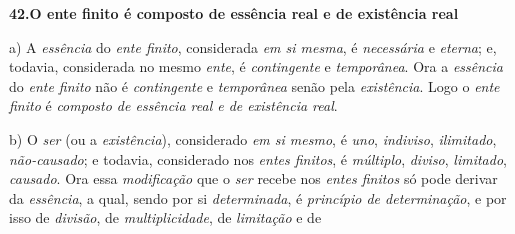 \documentclass[12pt,a4paper]{article}
\newcommand{\teseB}[2]{\bigskip\noindent\textbf{#1.\quad #2}\par}
\newcommand{\subp}[1]{\medskip\noindent#1)\quad}
\begin{document}
\teseB{42}{O ente finito é composto de essência real e de existência real}

\subp{a} A \emph{essência} do \emph{ente finito}, considerada \emph{em si
mesma}, é \emph{necessária} e \emph{eterna}; e, todavia, considerada no mesmo
\emph{ente}, é \emph{contingente} e \emph{temporânea}. Ora a \emph{essência} do
\emph{ente finito} não é \emph{contingente} e \emph{temporânea} senão pela
\emph{existência}. Logo o \emph{ente finito} é \emph{composto de essência real e
de existência real}.

\subp{b} O \emph{ser} (ou a \emph{existência}), considerado \emph{em si mesmo},
é \emph{uno}, \emph{indiviso}, \emph{ilimitado}, \emph{não-causado}; e todavia,
considerado nos \emph{entes finitos}, é \emph{múltiplo}, \emph{diviso},
\emph{limitado}, \emph{causado}. Ora essa \emph{modificação} que o \emph{ser}
recebe nos \emph{entes finitos} só pode derivar da \emph{essência}, a qual,
sendo por si \emph{determinada}, é \emph{princípio de determinação}, e por isso
de \emph{divisão}, de \emph{multiplicidade}, de \emph{limitação} e de
\end{document}

